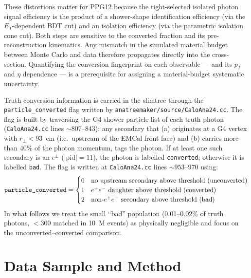 \documentclass[11pt,a4paper]{article}
\newcommand{\epem}{\ensuremath{e^{+}e^{-}}}
\begin{document}
These distortions matter for PPG12 because the tight-selected isolated photon
signal efficiency is the product of a shower-shape identification efficiency
(via the $E_T$-dependent BDT cut) and an isolation efficiency (via the
parametric isolation cone cut). Both steps are sensitive to the converted
fraction and its pre-reconstruction kinematics. Any mismatch in the simulated
material budget between Monte Carlo and data therefore propagates directly
into the cross-section. Quantifying the conversion fingerprint on each
observable --- and its \(p_T\) and \(\eta\) dependence --- is a prerequisite
for assigning a material-budget systematic uncertainty.

Truth conversion information is carried in the slimtree through the
\texttt{particle\_converted} flag written by
\texttt{anatreemaker/source/CaloAna24.cc}.  The flag is built by traversing the
G4 shower particle list of each truth photon
(\texttt{CaloAna24.cc} lines \(\sim 807\text{--}843\)): any secondary that
(a) originates at a G4 vertex with $r_\perp<93$~cm (i.e.\ upstream of the EMCal
front face) and (b) carries more than 40\% of the photon momentum, tags the
photon.  If at least one such secondary is an \(e^{\pm}\)
(\(|\mathrm{pid}|=11\)), the photon is labelled \texttt{converted}; otherwise
it is labelled \texttt{bad}.  The flag is written at
\texttt{CaloAna24.cc} lines \(\sim 953\text{--}970\) using:
%
\begin{equation}
\texttt{particle\_converted} =
\begin{cases}
0 & \text{no upstream secondary above threshold (unconverted)} \\
1 & \text{\epem\ daughter above threshold (converted)} \\
2 & \text{non-\epem\ secondary above threshold (bad)}
\end{cases}
\end{equation}
%
In what follows we treat the small ``bad'' population (0.01--0.02\% of truth
photons, $<300$ matched in 10~M events) as physically negligible and focus on
the unconverted--converted comparison.


\section{Data Sample and Method}
\label{sec:sample}
\end{document}
